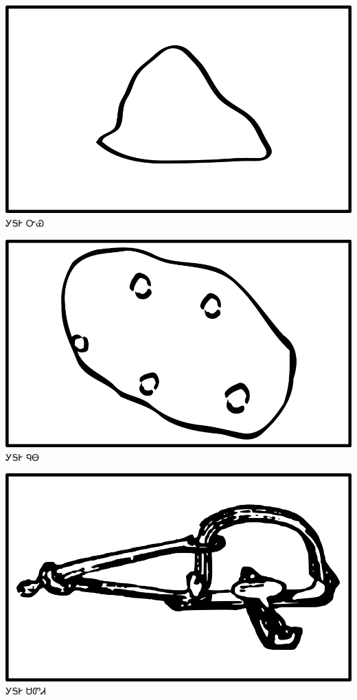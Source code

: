 \documentclass[avery5371]{flashcards}%
\begin{document}
\begin{flashcard}{
\includegraphics[width=0.95\columnwidth,height=.51\columnwidth,keepaspectratio]{../artwork/objects-neutral/nvya}
}\Huge ᎩᎦᎨ ᏅᏯ
\end{flashcard}

\begin{flashcard}{
\includegraphics[width=0.95\columnwidth,height=.51\columnwidth,keepaspectratio]{../artwork/objects-neutral/nuna}
}\Huge ᎩᎦᎨ ᏄᎾ
\end{flashcard}

\begin{flashcard}{
\includegraphics[width=0.95\columnwidth,height=.51\columnwidth,keepaspectratio]{../artwork/objects-neutral/sadvdi}
}\Huge ᎩᎦᎨ ᏌᏛᏗ
\end{flashcard}
\end{document}
